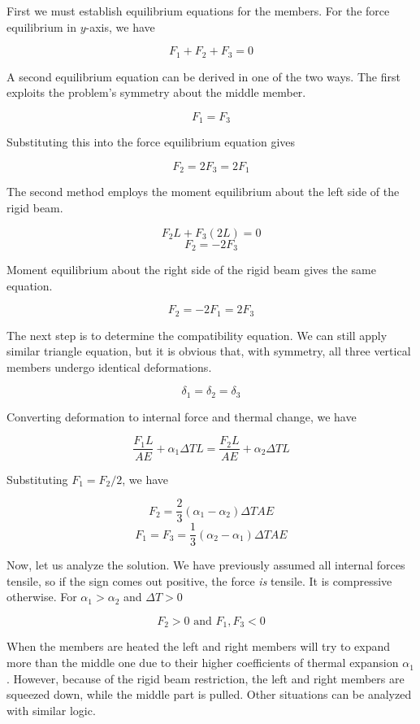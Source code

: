 \documentclass[
10pt,
a4paper,
openany,
svgnames,
]{book} %
\begin{document}
\begin{solution}
  First we must establish equilibrium equations for the members. For the force equilibrium in $y$-axis, we have

  $$ F_1 + F_2 + F_3 = 0 $$

  A second equilibrium equation can be derived in one of the two ways. The first exploits the problem's symmetry about the middle member.

  $$ F_1 = F_3 $$

  Substituting this into the force equilibrium equation gives

  $$ F_2 = 2F_3 = 2F_1 $$
  
  The second method employs the moment equilibrium about the left side of the rigid beam.

  $$ F_2 L + F_3 (2L) = 0 $$
  $$ F_2 = -2F_3 $$

  Moment equilibrium about the right side of the rigid beam gives the same equation.

  $$ F_2 = -2F_1 = 2F_3 $$

  The next step is to determine the compatibility equation. We can still apply similar triangle equation, but it is obvious that, with symmetry, all three vertical members undergo identical deformations. 

  $$ \delta_1 = \delta_2 = \delta_3 $$

  Converting deformation to internal force and thermal change, we have

  $$ \frac{F_1 L}{AE} + \alpha_1 \Delta TL = \frac{F_2 L}{AE} + \alpha_2 \Delta TL $$ 

  Substituting $F_1 = F_2 / 2$, we have

  $$ F_2 = \frac{2}{3} \left( \alpha_1 - \alpha_2 \right) \Delta T A E $$
  $$ F_1 = F_3 = \frac{1}{3} \left( \alpha_2 - \alpha_1 \right) \Delta T A E $$

  Now, let us analyze the solution. We have previously assumed all internal forces tensile, so if the sign comes out positive, the force \emph{is} tensile. It is compressive otherwise. For $\alpha_1 > \alpha_2$ and $\Delta T > 0$

  $$ F_2 > 0 \text{ and } F_1, F_3 < 0 $$

  When the members are heated the left and right members will try to expand more than the middle one due to their higher coefficients of thermal expansion $\alpha_1$. However, because of the rigid beam restriction, the left and right members are squeezed down, while the middle part is pulled. Other situations can be analyzed with similar logic.
\end{solution}
\end{document}
